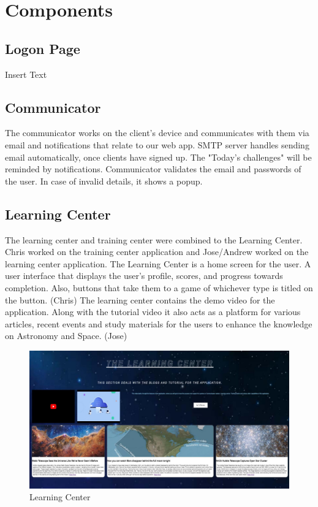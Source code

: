 \documentclass[12pt]{article}
\begin{document}
\section{Components}
    \subsection{Logon Page}

    Insert Text

    \subsection{Communicator}

    The communicator works on the client’s device and communicates with them via email and notifications that relate to our web app. SMTP server handles sending email automatically, once clients have signed up. The "Today’s challenges" will be reminded by notifications. Communicator validates the email and passwords of the user. In case of invalid details, it shows a popup.\cite{smtp}

    \subsection{Learning Center}
    The learning center and training center were combined to the Learning Center.  Chris worked on the training center application and Jose/Andrew worked on the learning center application.  The Learning Center is a home screen for the user.  A user interface that displays the user's profile, scores, and progress towards completion. Also, buttons that take them to a game of whichever type is titled on the button. (Chris) The learning center contains the demo video for the application. Along with the tutorial video it also acts as a platform for various articles, recent events and study materials for the users to enhance the knowledge on Astronomy and Space. (Jose)

    \begin{figure}[ht]
        \centering
        \includegraphics[height=0.35\textheight]{LearningCenter.jpg}
        \caption{Learning Center}
    \end{figure}
\end{document}
